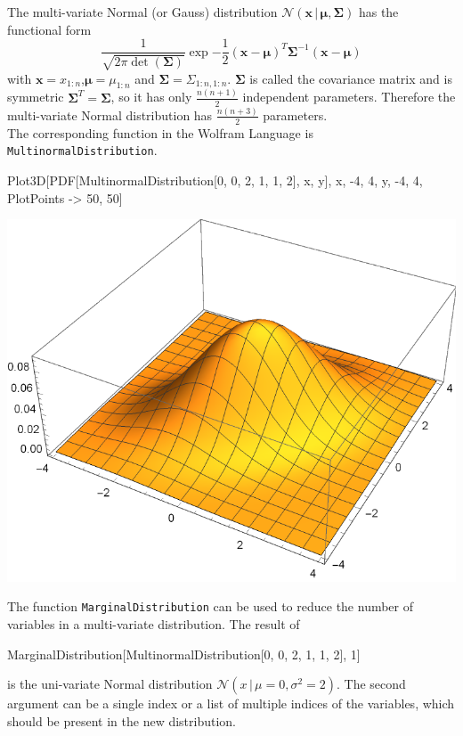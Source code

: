 \documentclass{tstextbook}
\begin{document}
\begin{example}
  The multi-variate Normal (or Gauss) distribution
  $\mathcal{N}\left(\mathbf{x}\,\vert\,\boldsymbol{\mu},\boldsymbol{\Sigma}\right)$ has the functional form
  \begin{equation}
    \frac{1}{\sqrt{2\pi \det(\boldsymbol{\Sigma})}}\exp{-\frac{1}{2}(\mathbf{x}-\boldsymbol{\mu})^T\boldsymbol{\Sigma}^{-1}(\mathbf{x}-\boldsymbol{\mu})}
  \end{equation}
with $\mathbf{x}=x_{1:n}$,$\boldsymbol{\mu}=\mu_{1:n}$ and $\boldsymbol{\Sigma}=\Sigma_{1:n,1:n}$. $\boldsymbol{\Sigma}$ is called the covariance matrix and is symmetric $\boldsymbol{\Sigma}^T=\boldsymbol{\Sigma}$, so it has only $\frac{n(n+1)}{2}$ independent parameters. Therefore the multi-variate Normal distribution has $\frac{n(n+3)}{2}$ parameters.\\

The corresponding function in the Wolfram Language is \texttt{MultinormalDistribution}. \begin{mathematica}
Plot3D[PDF[MultinormalDistribution[{0, 0}, {{2, 1}, {1, 2}}], {x, y}],
       {x, -4, 4}, {y, -4, 4}, PlotPoints -> {50, 50}]
\end{mathematica}
\includegraphics[scale=0.8]{images/multi_normal_distribution.pdf}

The function \texttt{MarginalDistribution} can be used to reduce the number of variables in a multi-variate distribution. The result of
\begin{mathematica}
MarginalDistribution[MultinormalDistribution[{0, 0}, {{2, 1}, {1, 2}}], 1]
\end{mathematica}
is the uni-variate Normal distribution $\mathcal{N}\left(x\,\vert\,\mu=0,\sigma^2=2\right)$. The second argument can be a single index or a list of multiple indices of the variables, which should be present in the new distribution.   
\end{example}
\end{document}
